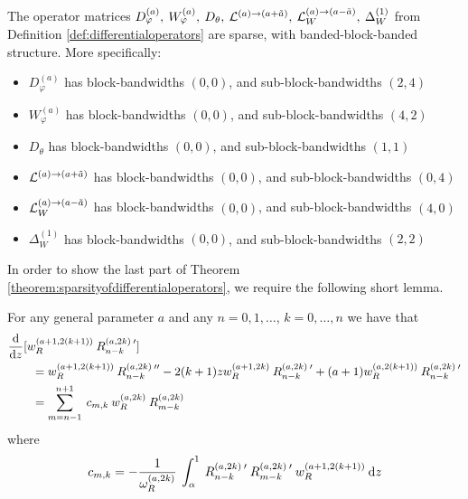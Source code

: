 \documentclass[11pt, oneside]{article}   	%
\begin{document}
\begin{theorem}\label{theorem:sparsityofdifferentialoperators}
	The operator matrices $D_\varphi^{(a)}, \: W_\varphi^{(a)}, \: D_\theta, \: \mathcal{L}^{(a)\to(a+\tilde a)}, \: \mathcal{L}_W^{(a)\to(a-\tilde a)}, \: \Delta^{(1)}_W$ from Definition \ref{def:differentialoperators} are sparse, with banded-block-banded structure. More specifically:
\begin{itemize}
	\item $D_\varphi^{(a)}$ has block-bandwidths $(0,0)$, and sub-block-bandwidths $(2, 4)$
  	\item $W_\varphi^{(a)}$ has block-bandwidths $(0,0)$, and sub-block-bandwidths $(4, 2)$
	\item $D_\theta$ has  block-bandwidths $(0,0)$, and sub-block-bandwidths $(1, 1)$
	\item $\mathcal{L}^{(a)\to(a+\tilde a)}$ has block-bandwidths $(0,0)$, and sub-block-bandwidths $(0, 4)$
	\item $\mathcal{L}_W^{(a)\to(a-\tilde a)}$ has block-bandwidths $(0,0)$, and sub-block-bandwidths $(4, 0)$
	\item $\Delta^{(1)}_W$ has block-bandwidths $(0,0)$, and sub-block-bandwidths $(2, 2)$
\end{itemize}
\end{theorem}

In order to show the last part of Theorem \ref{theorem:sparsityofdifferentialoperators}, we require the following short lemma.

\begin{lemma}\label{lemma:Rsecondderivative}
	For any general parameter $a$ and any $n = 0,1,\dots$, $k = 0,\dots,n$ we have that
\begin{align*}
	&{{\rm d} \over {\rm d} z}[w_R^{(a+1, 2(k+1))} \: R_{n-k}^{(a,2k) \: \prime}] \\
	&\quad \quad = w_R^{(a+1, 2(k+1))} \: R_{n-k}^{(a,2k) \: \prime \prime} - 2(k+1)z w_R^{(a+1, 2k)} \: R_{n-k}^{(a,2k) \: \prime} + (a+1) w_R^{(a, 2(k+1))} \: R_{n-k}^{(a,2k) \: \prime} \\
	&\quad \quad = \sum_{m = n-1}^{n+1} \: c_{m,k} \: w_R^{(a, 2k)} \: R_{m-k}^{(a,2k)}
\end{align*}
where 
\begin{align*}
	c_{m,k} = - \frac{1}{\omega_R^{(a,2k)}} \: \int_\alpha^1 \: R_{n-k}^{(a,2k) \: \prime} \: R_{m-k}^{(a,2k) \: \prime} \: w_R^{(a+1, 2(k+1))} \: {\rm d} z
\end{align*}
\end{lemma}
\end{document}

